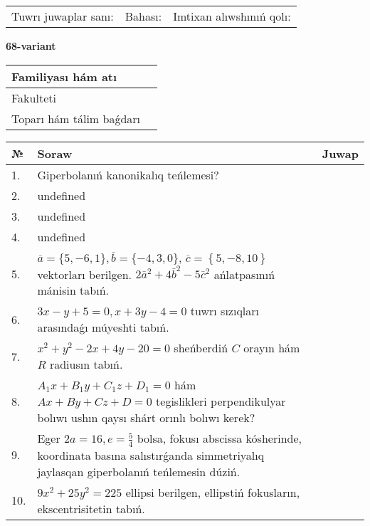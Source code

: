 \documentclass{article}
\begin{document}
\vspace{0.7cm}

\begin{tabular}{lll}
Tuwrı juwaplar sanı: \underline{\hspace{1cm}} & 
Bahası: \underline{\hspace{1cm}} & 
Imtixan alıwshınıń qolı: \underline{\hspace{2cm}} \\
\end{tabular}

\egroup

\newpage


\textbf{68-variant}\\

\bgroup
\def\arraystretch{1.6} %

\begin{tabular}{|m{5.7cm}|m{9.5cm}|}
\hline
Familiyası hám atı & \\
\hline
Fakulteti  & \\
\hline
Toparı hám tálim baǵdarı  & \\
\hline
\end{tabular}

\vspace{0.7cm}

\begin{tabular}{|m{0.7cm}|m{10cm}|m{4cm}|}
\hline
№ & Soraw & Juwap \\
\hline
1. & Giperbolanıń kanonikalıq teńlemesi? &  \\
\hline
2. & undefined &  \\
\hline
3. & undefined &  \\
\hline
4. & undefined &  \\
\hline
5. & \(\overline{a} = \{5,- 6, 1 \}, \overline{b} = \{ - 4, 3, 0 \} \), \(\overline{c} = \left\{ 5,- 8, 10 \right\}\) vektorları berilgen. \(2{\bar{a}}^{2} + 4{\bar{b}}^{2} - 5{\bar{c}}^{2}\) ańlatpasınıń mánisin tabıń. &  \\
\hline
6. & \(3 x - y + 5 = 0, x + 3 y - 4 = 0\) tuwrı sızıqları arasındaǵı múyeshti tabıń. &  \\
\hline
7. & \(x^{2} + y^{2} - 2 x + 4 y - 20 = 0\) sheńberdiń \(C\) orayın hám \(R\) radiusın tabıń. &  \\
\hline
8. & \(A_{1}x + B_{1}y + C_{1}z + D_{1} = 0\) hám \(Ax + By + Cz + D = 0\) tegislikleri perpendikulyar bolıwı ushın qaysı shárt orınlı bolıwı kerek? &  \\
\hline
9. & Eger \(2 a = 16, e = \frac{5}{4}\) bolsa, fokusı abscissa kósherinde, koordinata basına salıstırǵanda simmetriyalıq jaylasqan giperbolanıń teńlemesin dúziń. &  \\
\hline
10. & \(9 x^{2} + 25 y^{2} = 225\) ellipsi berilgen, ellipstiń fokusların, ekscentrisitetin tabıń. & \\
\hline
\end{tabular}
\end{document}
